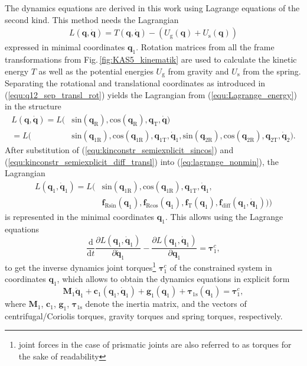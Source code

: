 \documentclass{svproc}
\newcommand{\bm}[1]{\boldsymbol{#1}}
\begin{document}
The dynamics equations are derived in this work using Lagrange equations of the second kind. This method needs the Lagrangian 
%
\begin{align}
L(\bm{q},\dot{\bm{q}}) = T(\bm{q},\dot{\bm{q}})-(U_{\mathrm{g}}(\bm{q})+U_{\mathrm{s}}(\bm{q}))
\label{equ:Lagrange_energy}
\end{align}
%
expressed in minimal coordinates $\bm{q}_{1}$.
Rotation matrices from all the frame transformations from Fig.\,\ref{fig:KAS5_kinematik} are used to calculate the kinetic energy $T$ as well as the potential energies $U_{\mathrm{g}}$ from gravity and $U_{\mathrm{s}}$ from the spring.
Separating the rotational and translational coordinates as introduced in (\ref{equ:q12_sep_transl_rot}) yields the Lagrangian from (\ref{equ:Lagrange_energy}) in the structure
%
\begin{align}
L(\bm{q},\dot{\bm{q}}) =L( & \mathrm{sin}  (\bm{q}_{\mathrm{R}}),\mathrm{cos}(\bm{q}_{\mathrm{R}}), \bm{q}_{\mathrm{T}},\dot{\bm{q}}) \\\label{eq:lagrange_nonmin}
=L( & \mathrm{sin}  (\bm{q}_{1\mathrm{R}}),\mathrm{cos}(\bm{q}_{1\mathrm{R}}), \bm{q}_{1\mathrm{T}},\dot{\bm{q}}_{1}, \mathrm{sin}  (\bm{q}_{2\mathrm{R}}),\mathrm{cos}(\bm{q}_{2\mathrm{R}}), \bm{q}_{2\mathrm{T}},\dot{\bm{q}}_{2}).
\end{align}
%
After substitution of (\ref{equ:kinconstr_semiexplicit_sincos}) and (\ref{equ:kinconstr_semiexplicit_diff_transl}) into (\ref{eq:lagrange_nonmin}), the Lagrangian 
%
\begin{align}
L(\bm{q}_1,\dot{\bm{q}}_1)=L( & \mathrm{sin} (\bm{q}_{1\mathrm{R}}),\mathrm{cos}(\bm{q}_{1\mathrm{R}}), \bm{q}_{1\mathrm{T}},\dot{\bm{q}}_{1}, \\ &
\bm{f}_{\mathrm{R}\mathrm{sin}}(\bm{q}_1),
\bm{f}_{\mathrm{R}\mathrm{cos}}(\bm{q}_1),
\bm{f}_{\mathrm{T}}(\bm{q}_1),
\bm{f}_{\mathrm{diff}}(\bm{q}_1,\dot{\bm{q}}_1))) \nonumber
\end{align}
%
is represented in the minimal coordinates $\bm{q}_1$.
This allows using the Lagrange equations
%
\begin{equation}
\frac{\mathrm{d}}{{\mathrm{d}}t}\frac{\partial L(\bm{q}_1,\dot{\bm{q}}_1)}{\partial \dot{\bm{q}}_1} - \frac{\partial L(\bm{q}_1,\dot{\bm{q}}_1)}{\partial \bm{q}_1}= \bm{\tau}^c_1,
\end{equation}
%
to get the inverse dynamics joint torques\footnote{joint forces in the case of prismatic joints are also referred to as torques for the sake of readability} $\bm{\tau}^c_1$ of the constrained system in coordinates $\bm{q}_1$, which allows to obtain the dynamics equations in explicit form
%
\begin{equation}
\bm{M}_1\ddot{\bm{q}}_1+\bm{c}_1(\bm{q}_1,\dot{\bm{q}}_1)+\bm{g}_1(\bm{q}_1) + \bm{\tau}_{1\mathrm{s}}(\bm{q}_1) = \bm{\tau}^c_1,
\label{equ:Dyn_MinKoord}
\end{equation}
%
where $\bm{M}_1$, $\bm{c}_1$, $\bm{g}_1$, $\bm{\tau}_{1\mathrm{s}}$ denote the inertia matrix, and the vectors of centrifugal/Coriolis torques, gravity torques and spring torques, respectively.
\end{document}
